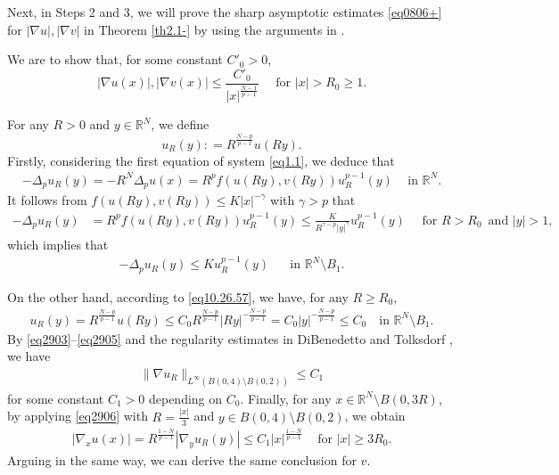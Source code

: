 \documentclass[12pt]{amsart}
\theoremstyle{definition}
\theoremstyle{remark}
\theoremstyle{conclusion}
\theoremstyle{conjecture}
\numberwithin{equation}{section}
\newcommand{\R}{\mathbb{R}}
\begin{document}
\medskip

Next, in Steps 2 and 3, we will prove the sharp asymptotic estimates \eqref{eq0806+} for $|\nabla u|, |\nabla v|$ in Theorem \ref{th2.1-} by using the arguments in \cite{BS16,VJ16}.

\smallskip

We are to show that, for some constant $C'_0>0$,
$$ |\nabla u(x)|, |\nabla v(x)| \leq \frac{C'_0}{|x|^\frac{N-1}{p-1}}\,\,\,\,\,\,\,\,\mbox{for}\,\,|x|>R_0\geq 1.$$


For any $R>0$ and $y\in \R^N$, we define
$$ u_R (y): =R^\frac{N-p}{p-1}u(Ry).$$
Firstly, considering the first equation of system \eqref{eq1.1}, we deduce that
\begin{align}\label{eq2901}
-\Delta_p u_R(y)
=-R^N \Delta_p u(x)=R^p f(u(Ry),v(Ry))u^{p-1}_R(y) \,\,\,\,\,\,\,\mbox{in}\,\,\R^N.
\end{align}
It follows from $f(u(Ry),v(Ry)) \leq K|x|^{-\gamma}$ with $\gamma>p$ that
\begin{align}\label{eq2902}
-\Delta_p u_R(y)
&=R^p f(u(Ry),v(Ry)) u^{p-1}_R(y) \leq \frac{K}{R^{\gamma-p} |y|^{\gamma}} u^{p-1}_R(y) \, \,\,\,\,\,\,\,\mbox{for}\,\,R>R_0\,\,\,\mbox{and}\,\,|y|>1,
\end{align}
which implies that
\begin{align}\label{eq2903}
-\Delta_p u_R(y)
\leq Ku^{p-1}_R(y) \,\,\,\,\,\,\,\,\,\,\mbox{in}\,\,\R^N\setminus B_1.
\end{align}

On the other hand, according to \eqref{eq10.26.57}, we have, for any $R\geq R_0$,
\begin{align}\label{eq2905}
u_R (y) =R^\frac{N-p}{p-1} u(Ry)\leq C_0 R^\frac{N-p}{p-1} |Ry|^{-\frac{N-p}{p-1}}= C_0 |y|^{-\frac{N-p}{p-1}} \leq C_0 \,\,\,\,\,\,\mbox{in}\,\,\R^N\setminus B_1.
\end{align}
By \eqref{eq2903}--\eqref{eq2905} and the regularity estimates in DiBenedetto \cite{ED83} and Tolksdorf \cite{PT}, we have
\begin{align}\label{eq2906}
\|\nabla u_R\|_{L^\infty (B(0,4) \setminus B(0,2))}\leq C_1
\end{align}
for some constant $C_1>0$ depending on $C_{0}$. Finally, for any $x\in\R^N\setminus B(0,3R)$, by applying \eqref{eq2906} with $R=\frac{|x|}{3}$ and $y\in B(0,4) \setminus B(0,2)$, we obtain
\begin{align}\label{eq2907}
|\nabla_x u(x)|= R^\frac{1-N}{p-1} |\nabla_y u_R(y) | \leq C_1 |x|^\frac{1-N}{p-1}\,\,\,\,\,\,\,\mbox{for}\,\,|x|\geq 3 R_0.
\end{align}
Arguing in the same way, we can derive the same conclusion for $v$.
\end{document}
